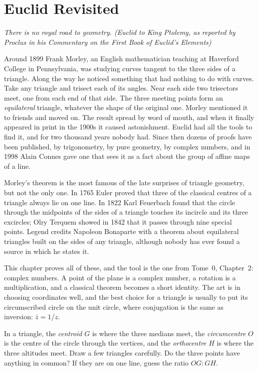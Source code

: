 \chapter{Euclid Revisited}\label{geometry:ch:euclid}

\begin{center}\itshape
There is no royal road to geometry.
\upshape(Euclid to King Ptolemy, as reported by Proclus in his \emph{Commentary on the First Book of Euclid's Elements})
\end{center}

Around 1899 Frank Morley, an English mathematician teaching at Haverford College in Pennsylvania, was studying curves
tangent to the three sides of a triangle. Along the way he noticed something that had nothing to do with curves. Take any
triangle and trisect each of its angles. Near each side two trisectors meet, one from each end of that side. The three
meeting points form an \emph{equilateral} triangle, whatever the shape of the original one. Morley mentioned it to friends
and moved on. The result spread by word of mouth, and when it finally appeared in print in the 1900s it caused
astonishment. Euclid had all the tools to find it, and for two thousand years nobody had. Since then dozens of proofs
have been published, by trigonometry, by pure geometry, by complex numbers, and in 1998 Alain Connes gave one that sees it
as a fact about the group of affine maps of a line.

Morley's theorem is the most famous of the late surprises of triangle geometry, but not the only one. In 1765 Euler proved that
three of the classical centres of a triangle always lie on one line. In 1822 Karl Feuerbach found that the circle through the midpoints of the sides
of a triangle touches its incircle and its three excircles; Olry Terquem showed in 1842 that it passes through nine special points. Legend credits Napoleon Bonaparte with a theorem about
equilateral triangles built on the sides of any triangle, although nobody has ever found a source in which he states it.

This chapter proves all of these, and the tool is the one from Tome~0, Chapter~2: complex numbers. A point of the plane is a
complex number, a rotation is a multiplication, and a classical theorem becomes a short identity. The art is in choosing
coordinates well, and the best choice for a triangle is usually to put its circumscribed circle on the unit circle, where
conjugation is the same as inversion: $\bar z=1/z$.

\begin{think}
In a triangle, the \emph{centroid} $G$ is where the three medians meet, the \emph{circumcentre} $O$ is the centre of the circle
through the vertices, and the \emph{orthocentre} $H$ is where the three altitudes meet. Draw a few triangles carefully. Do the
three points have anything in common? If they are on one line, guess the ratio $OG:GH$.
\end{think}

